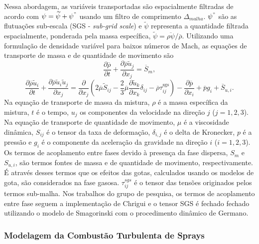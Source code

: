 Nessa abordagem, as variáveis transportadas são espacialmente filtradas de acordo com $\psi = \widetilde\psi + \psi^"$ usando um filtro de comprimento $\Delta_{malha}$. $\psi^"$ são as flutuações sub-escala (SGS - \emph{sub-grid scale}) e $\widetilde\psi$ representa a quantidade filtrada espacialmente, ponderada pela massa específica, $\widetilde\psi = \overline{\rho\psi}/\overline\rho$.
Utilizando uma formulação de densidade variável para baixos números de Mach, as equações de transporte de massa e de quantidade de movimento são
\begin{equation}
    \frac{\partial \overline \rho}{\partial t} + 
    \frac{\partial \overline \rho \widetilde u_j}{\partial x_j} = 
    \overline S_m,
\end{equation}
\begin{equation}
    \frac{\partial \overline\rho \widetilde u_i}{\partial t} + 
    \frac{\partial \overline\rho \widetilde u_i \widetilde u_j}{\partial x_j} =
    \frac{\partial }{\partial x_j} \left(
        2\overline\mu \widetilde S_{ij} -
        \frac{2}{3}\overline\mu \frac{\partial \widetilde u_k}{\partial x_k} \delta_{ij} -
        \overline\rho \tau_{ij}^{\text{sgs}}
    \right) -
    \frac{\partial \overline p}{\partial x_i} +
    \overline p g_i + 
    \overline S_{u,i}.
\end{equation}
Na equação de transporte de massa da mistura, $\rho$ é a massa específica da mistura, $t$ é o tempo, $u_j$ os componentes da velocidade na direção $j$ ($j=1,2,3$).
Na equação de transporte de quantidade de movimento, $\mu$ é a viscosidade dinâmica, $S_{ij}$ é o tensor da taxa de deformação, $\delta_{i,j}$ é o delta de Kronecker, $p$ é a pressão e $g_i$ é o componente da aceleração da gravidade na direção	$i$ ($i=1,2,3$). 
Os termos de acoplamento entre fases devido à presença da fase dispersa, $S_m$ e $S_{u,i}$,  são termos fontes de massa e de quantidade de movimento, respectivamente.
É através desses termos que os efeitos das gotas, calculados usando os modelos de gota, são considerados na fase gasosa.
$\tau_{ij}^{sgs}$ é o tensor das tensões originados pelos termos sub-malha.
Nos trabalhos do grupo de pesquisa, os termos de acoplamento entre fase seguem a implementação de Chrigui\etal{} \cite{ChriguiM2012} e o tensor SGS é fechado fechado utilizando o modelo de Smagorinski \cite{Pope2000} com o procedimento dinâmico de Germano\etal \cite{Germano1991}.

\subsubsection{Modelagem da Combustão Turbulenta de Sprays} \label{sec:comb-sprays}

